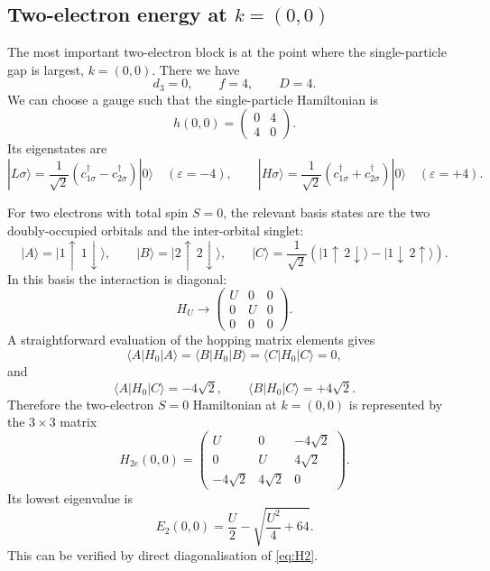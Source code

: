 \documentclass[11pt,a4paper]{article}
\begin{document}
\subsection{Two-electron energy at \(k=(0,0)\)}

The most important two-electron block is at the point where the single-particle gap is largest, \(k=(0,0)\). There we have
\[
d_3=0,\qquad f=4,\qquad D=4.
\]
We can choose a gauge such that the single-particle Hamiltonian is
\[
h(0,0) =
\begin{pmatrix}
0 & 4\\
4 & 0
\end{pmatrix}.
\]
Its eigenstates are
\[
|L\sigma\rangle = \frac{1}{\sqrt2}(c_{1\sigma}^{\dagger}-c_{2\sigma}^{\dagger})|0\rangle
\quad(\varepsilon=-4),
\qquad
|H\sigma\rangle = \frac{1}{\sqrt2}(c_{1\sigma}^{\dagger}+c_{2\sigma}^{\dagger})|0\rangle
\quad(\varepsilon=+4).
\]

For two electrons with total spin \(S=0\), the relevant basis states are the two doubly-occupied orbitals and the inter-orbital singlet:
\[
|A\rangle = |1{\uparrow}\,1{\downarrow}\rangle,
\qquad
|B\rangle = |2{\uparrow}\,2{\downarrow}\rangle,
\qquad
|C\rangle = \frac{1}{\sqrt2}\left(|1{\uparrow}\,2{\downarrow}\rangle - |1{\downarrow}\,2{\uparrow}\rangle\right).
\]
In this basis the interaction is diagonal:
\[
H_U \to
\begin{pmatrix}
U & 0 & 0\\
0 & U & 0\\
0 & 0 & 0
\end{pmatrix}.
\]
A straightforward evaluation of the hopping matrix elements gives
\[
\langle A|H_0|A\rangle = \langle B|H_0|B\rangle = \langle C|H_0|C\rangle = 0,
\]
and
\[
\langle A|H_0|C\rangle = -4\sqrt2,
\qquad
\langle B|H_0|C\rangle = +4\sqrt2.
\]
Therefore the two-electron \(S=0\) Hamiltonian at \(k=(0,0)\) is represented by the \(3\times3\) matrix
\begin{equation}
\label{eq:H2}
H_{2e}(0,0) =
\begin{pmatrix}
U & 0 & -4\sqrt2\\
0 & U & 4\sqrt2\\
-4\sqrt2 & 4\sqrt2 & 0
\end{pmatrix}.
\end{equation}
Its lowest eigenvalue is
\begin{equation}
\label{eq:E2}
E_2(0,0) = \frac{U}{2} - \sqrt{\frac{U^2}{4}+64}.
\end{equation}
This can be verified by direct diagonalisation of \eqref{eq:H2}.
\end{document}
